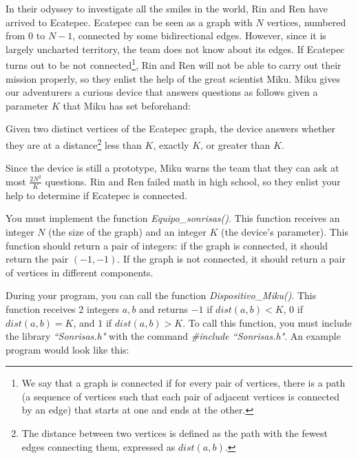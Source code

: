 \documentclass[12pt]{scrartcl}
\begin{document}

    \vspace{10pt}


        In their odyssey to investigate all the smiles in the world, Rin and Ren have arrived to Ecatepec. Ecatepec can be seen as a graph with $N$ vertices, numbered from $0$ to $N - 1$, connected by some bidirectional edges. However, since it is largely uncharted territory, the team does not know about its edges. If Ecatepec turns out to be not connected\footnote{We say that a graph is connected if for every pair of vertices, there is a path (a sequence of vertices such that each pair of adjacent vertices is connected by an edge) that starts at one and ends at the other.}, Rin and Ren will not be able to carry out their mission properly, so they enlist the help of the great scientist Miku. Miku gives our adventurers a curious device that answers questions as follows given a parameter $K$ that Miku has set beforehand:

        Given two distinct vertices of the Ecatepec graph, the device answers whether they are at a distance\footnote{The distance between two vertices is defined as the path with the fewest edges connecting them, expressed as $dist(a, b)$.} less than $K$, exactly $K$, or greater than $K$.

        Since the device is still a prototype, Miku warns the team that they can ask at most $\frac{2N^2}{K}$ questions. Rin and Ren failed math in high school, so they enlist your help to determine if Ecatepec is connected.
        


        You must implement the function \textit{Equipo\_sonrisas()}. This function receives an integer $N$ (the size of the graph) and an integer $K$ (the device's parameter). This function should return a pair of integers: if the graph is connected, it should return the pair $(-1, -1)$. If the graph is not connected, it should return a pair of vertices in different components. 
        
        During your program, you can call the function \textit{Dispositivo\_Miku()}. This function receives 2 integers $a, b$ and returns $-1$ if $dist(a, b) < K$, $0$ if $dist(a, b) = K$, and $1$ if $dist(a, b) > K$.
        To call this function, you must include the library \textit{``Sonrisas.h"} with the command \textit{\#include ``Sonrisas.h"}.
        An example program would look like this:
\end{document}

